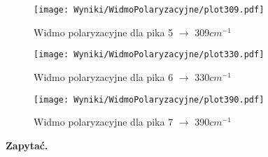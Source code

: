 \begin{figure}[H]
	\begin{center}
		\texttt{[image: Wyniki/WidmoPolaryzacyjne/plot309.pdf]}
		\caption{Widmo polaryzacyjne dla pika 5 $\rightarrow$ 309$cm^{-1}$ }
	\end{center}
\end{figure}

\begin{figure}[H]
	\begin{center}
		\texttt{[image: Wyniki/WidmoPolaryzacyjne/plot330.pdf]}
		\caption{Widmo polaryzacyjne dla pika 6 $\rightarrow$ 330$cm^{-1}$ }
	\end{center}
\end{figure}

\begin{figure}[H]
	\begin{center}
		\texttt{[image: Wyniki/WidmoPolaryzacyjne/plot390.pdf]}
		\caption{Widmo polaryzacyjne dla pika 7 $\rightarrow$ 390$cm^{-1}$ }
	\end{center}
\end{figure}

\textbf{Zapytać.}


